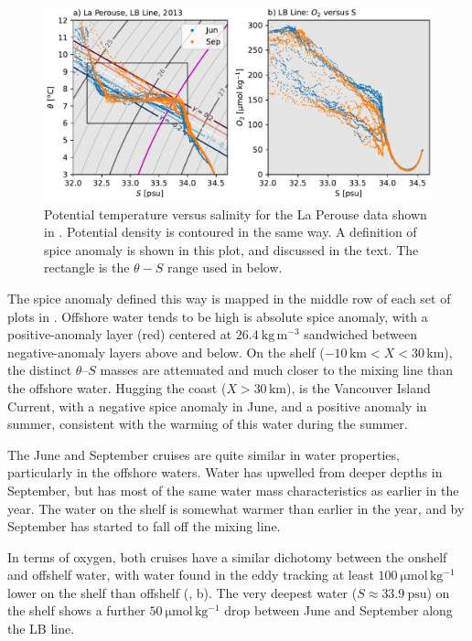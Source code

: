 \documentclass[draft]{agujournal2019}
\begin{document}
\begin{figure}[htbp]
  \begin{center}
     \includegraphics[width=5in]{LaPerouse2013TS}
     \caption{Potential temperature versus salinity for the La Perouse data shown in .  Potential density is contoured in the same way.  A definition of spice anomaly is shown in this plot, and discussed in the text.  The rectangle is the $\theta-S$ range used in  below.}
     \label{fig:LaPerouse2013TS}
  \end{center}
\end{figure}

The spice anomaly defined this way is mapped in the middle row of each set of plots in .  Offshore water tends to be high is absolute spice anomaly, with a positive-anomaly layer (red) centered at $26.4\ \mathrm{kg\,m^{-3}}$ sandwiched between negative-anomaly layers above and below.  On the shelf ($-10\, \mathrm{km} < X < 30\, \mathrm{km}$), the distinct $\theta$--$S$ masses are attenuated and much closer to the mixing line than the offshore water.  Hugging the coast ($X > 30\, \mathrm{km}$), is the Vancouver Island Current, with a negative spice anomaly in June, and a positive anomaly in summer, consistent with the warming of this water during the summer.

The June and September cruises are quite similar in water properties, particularly in the offshore waters.  Water has upwelled from deeper depths in September, but has most of the same water mass characteristics as earlier in the year.  The water on the shelf is somewhat warmer than earlier in the year, and by September has started to fall off the mixing line.

In terms of oxygen, both cruises have a similar dichotomy between the onshelf and offshelf water, with water found in the eddy tracking at least $100\ \mathrm{\mu mol\, kg^{-1}}$ lower on the shelf than offshelf (, b).  The very deepest water ($S\approx 33.9\ \mathrm{psu}$) on the shelf shows a further $50\ \mathrm{\mu mol\, kg^{-1}}$ drop between June and September along the LB line.
\end{document}
